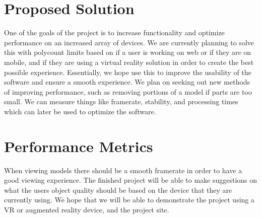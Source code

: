 \documentclass[letterpaper,10pt,draftclsnofoot,onecolumn, titlepage]{IEEEtran}
\begin{document}
\section{Proposed Solution}
{One of the goals of the project is to increase functionality and optimize performance on an increased array of devices. We are currently planning to solve this with polycount limits based on if a user is working on web or if they are on mobile, and if they are using a virtual reality solution in order to create the best possible experience. Essentially, we hope use this to improve the usability of the software and ensure a smooth experience. We plan on seeking out new methods of improving performance, such as removing portions of a model if parts are too small. We can measure things like framerate, stability, and processing times which can later be used to optimize the software.\par}
\section{Performance Metrics}
{When viewing models there should be a smooth framerate in order to have a good viewing experience. The finished project will be able to make suggestions on what the users object quality should be based on the device that they are currently using. We hope that we will be able to demonstrate the project using a VR or augmented reality device, and the project site. \par}

%
%
\end{document}
